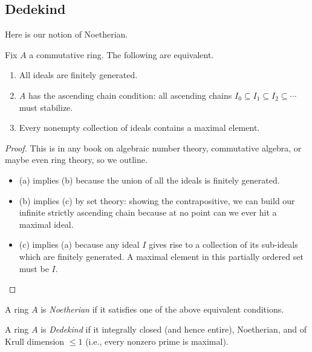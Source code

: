 \documentclass[../notes.tex]{subfiles}
\begin{document}
\subsection{Dedekind}
Here is our notion of Noetherian.
\begin{prop}
    Fix $A$ a commutative ring. The following are equivalent.
    \begin{enumerate}[label=(\alph*)]
        \item All ideals are finitely generated.
        \item $A$ has the ascending chain condition: all ascending chains $I_0\subseteq I_1\subseteq I_2\subseteq\cdots$ must stabilize.
        \item Every nonempty collection of ideals contains a maximal element.
    \end{enumerate}
\end{prop}
\begin{proof}
     This is in any book on algebraic number theory, commutative algebra, or maybe even ring theory, so we outline.
     \begin{itemize}
         \item (a) implies (b) because the union of all the ideals is finitely generated.
         \item (b) implies (c) by set theory: showing the contrapositive, we can build our infinite strictly ascending chain because at no point can we ever hit a maximal ideal.
         \item (c) implies (a) because any ideal $I$ gives rise to a collection of its sub-ideals which are finitely generated. A maximal element in this partially ordered set must be $I.$
         \qedhere
     \end{itemize}
\end{proof}
\begin{defi}[Noetherian]
    A ring $A$ is \textit{Noetherian} if it satisfies one of the above equivalent conditions.
\end{defi}
\begin{defi}[Dedekind]
    A ring $A$ is \textit{Dedekind} if it integrally closed (and hence entire), Noetherian, and of Krull dimension $\le1$ (i.e., every nonzero prime is maximal).
\end{defi}
\end{document}
